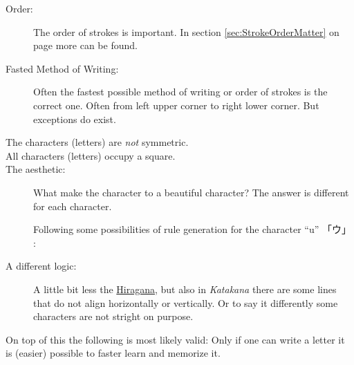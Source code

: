 \begin{description}

\item[Order:] The order of strokes is important. In section
\ref{sec:StrokeOrderMatter} on page \pageref{sec:StrokeOrderMatter} more can be
found. 

\item[Fasted Method of Writing:] Often the fastest possible method of writing
or order of strokes is the correct one.  Often from left upper corner to right
lower corner. But exceptions do exist.

\item[The characters (letters) are \textit{not} symmetric.]

\item[All characters (letters) occupy a square.]

\item[The aesthetic:] What make the character to a beautiful character? The
answer is different for each character.

Following some possibilities of rule generation for the character ``u''
 {「ウ」 }:

\bigskip {}

\bigskip {}


\bigskip {}


\bigskip {}

\bigskip

\item[A different logic:] A little bit less the \hyperref[sec:Hiragana]{Hiragana}, but also in
\textit{Katakana} there are some lines that do not align horizontally  or
vertically. Or to say it differently some characters are not stright on
purpose.

\end{description}

On top of this the following is most likely valid: Only if one can write a
letter it is (easier) possible to faster learn and memorize it.


